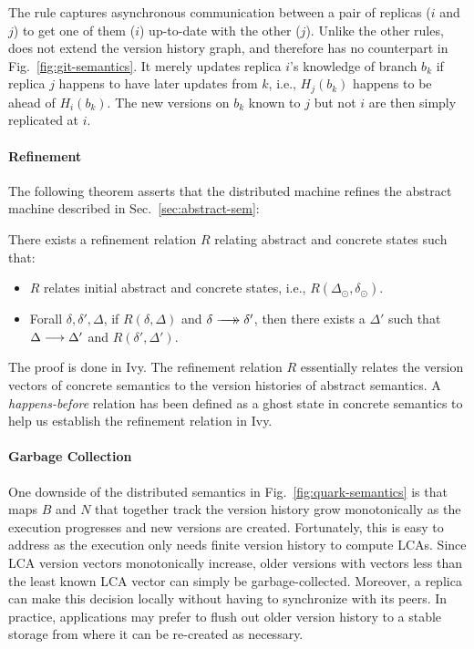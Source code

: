 The rule  captures asynchronous communication between
a pair of replicas ($i$ and $j$) to get one of them ($i$) up-to-date
with the other ($j$).  Unlike the other rules,  does
not extend the version history graph, and therefore has no counterpart
in Fig.~\ref{fig:git-semantics}. It merely updates replica $i$'s
knowledge of branch $b_k$ if replica $j$ happens to have later updates
from $k$, i.e., $H_j(b_k)$ happens to be ahead of $H_i(b_k)$. The new
versions on $b_k$ known to $j$ but not $i$ are then simply replicated
at $i$.

\paragraph{Refinement} The following theorem asserts that the \quark
distributed machine refines the abstract machine described in
Sec.~\ref{sec:abstract-sem}:
\begin{theorem}[{\bf Refinement}]
  \label{thm:refinement}
  There exists a refinement relation $R$ relating abstract and
  concrete states such that:
  \begin{itemize}
    \item $R$ relates initial abstract and concrete states, i.e.,
      $R(\Delta_{\odot},\delta_{\odot})$.
    \item Forall $\delta,\delta',\Delta$, if $R(\delta,\Delta)$ and
      $\delta \xrightarrow[]{\quad}\mathrel{\mkern-14mu}\rightarrow \delta'$, then there exists a $\Delta'$ such
      that $\Delta \longrightarrow \Delta'$ and $R(\delta',\Delta')$.
  \end{itemize}
\end{theorem}
The proof is done in Ivy. The refinement relation $R$ essentially
relates the version vectors of concrete semantics to the version
histories of abstract semantics. A \emph{happens-before} relation has
been defined as a ghost state in concrete semantics to help us
establish the refinement relation in Ivy.

\paragraph{Garbage Collection} One downside of the distributed
semantics in Fig.~\ref{fig:quark-semantics} is that maps $B$ and $N$
that together track the version history grow monotonically as the
execution progresses and new versions are created. Fortunately, this
is easy to address as the execution only needs finite version history
to compute LCAs. Since LCA version vectors monotonically increase,
older versions with vectors less than the least known LCA vector can
simply be garbage-collected. Moreover, a replica can make this
decision locally without having to synchronize with its peers. In
practice, applications may prefer to flush out older version history
to a stable storage from where it can be re-created as necessary.
